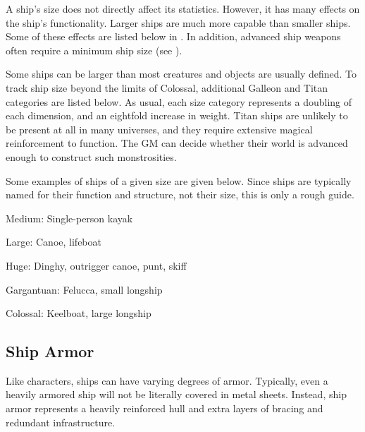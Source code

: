         A ship's size does not directly affect its statistics.
        However, it has many effects on the ship's functionality.
        Larger ships are much more capable than smaller ships.
        Some of these effects are listed below in .
        In addition, advanced ship weapons often require a minimum ship size (see ).

        Some ships can be larger than most creatures and objects are usually defined.
        To track ship size beyond the limits of Colossal, additional Galleon and Titan categories are listed below.
        As usual, each size category represents a doubling of each dimension, and an eightfold increase in weight.
        Titan ships are unlikely to be present at all in many universes, and they require extensive magical reinforcement to function.
        The GM can decide whether their world is advanced enough to construct such monstrosities.

        Some examples of ships of a given size are given below.
        Since ships are typically named for their function and structure, not their size, this is only a rough guide.
        \begin{raggeditemize}
            \item Medium: Single-person kayak
            \item Large: Canoe, lifeboat
            \item Huge: Dinghy, outrigger canoe, punt, skiff
            \item Gargantuan: Felucca, small longship
            \item Colossal: Keelboat, large longship
        \end{raggeditemize}

    \subsection{Ship Armor}
        Like characters, ships can have varying degrees of armor.
        Typically, even a heavily armored ship will not be literally covered in metal sheets.
        Instead, ship armor represents a heavily reinforced hull and extra layers of bracing and redundant infrastructure.

